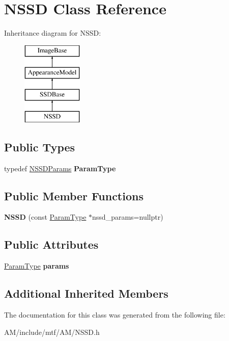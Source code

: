 \hypertarget{classNSSD}{\section{N\-S\-S\-D Class Reference}
\label{classNSSD}
}
Inheritance diagram for N\-S\-S\-D\-:\begin{figure}[H]
\begin{center}
\leavevmode
\includegraphics[height=4.000000cm]{classNSSD}
\end{center}
\end{figure}
\subsection*{Public Types}
\begin{DoxyCompactItemize}
\item 
\hypertarget{classNSSD_a32367cbdadb7d648facf1081bbf0801d}{typedef \hyperlink{structNSSDParams}{N\-S\-S\-D\-Params} {\bfseries Param\-Type}}\label{classNSSD_a32367cbdadb7d648facf1081bbf0801d}

\end{DoxyCompactItemize}
\subsection*{Public Member Functions}
\begin{DoxyCompactItemize}
\item 
\hypertarget{classNSSD_a56d12b610d42d0df8057447071cf7ba9}{{\bfseries N\-S\-S\-D} (const \hyperlink{structNSSDParams}{Param\-Type} $\ast$nssd\-\_\-params=nullptr)}\label{classNSSD_a56d12b610d42d0df8057447071cf7ba9}

\end{DoxyCompactItemize}
\subsection*{Public Attributes}
\begin{DoxyCompactItemize}
\item 
\hypertarget{classNSSD_a20af9d64c52e91d3f8794cbe801ca215}{\hyperlink{structNSSDParams}{Param\-Type} {\bfseries params}}\label{classNSSD_a20af9d64c52e91d3f8794cbe801ca215}

\end{DoxyCompactItemize}
\subsection*{Additional Inherited Members}


The documentation for this class was generated from the following file\-:\begin{DoxyCompactItemize}
\item 
A\-M/include/mtf/\-A\-M/N\-S\-S\-D.\-h\end{DoxyCompactItemize}

